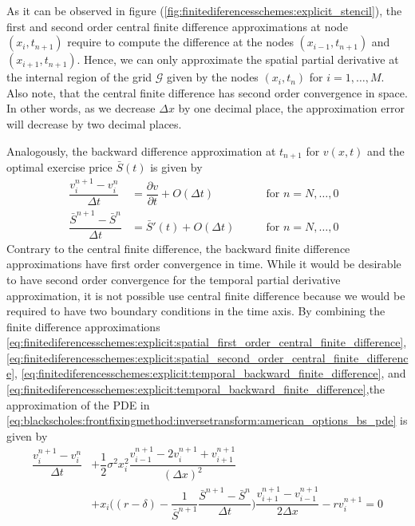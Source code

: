 As it can be observed in figure (\ref*{fig:finitediferencesschemes:explicit_stencil}), the first and second order central finite difference approximations at node $(x_i, t_{n+1})$ require to compute the difference at the nodes $(x_{i-1}, t_{n+1})$ and $(x_{i+1}, t_{n+1})$. Hence, we can only approximate the spatial partial derivative at the internal region of the grid $\mathcal{G}$ given by the nodes $(x_i, t_n)$ for $i=1,\dots,M$. Also note, that the central finite difference has second order convergence in space. In other words, as we decrease $\Delta{x}$ by one decimal place, the approximation error will decrease by two decimal places.

Analogously, the backward difference approximation at $t_{n+1}$ for $v(x, t)$ and the optimal exercise price $\bar{S}(t)$ is given by
\begin{align}
  \label{eq:finitediferencesschemes:explicit:temporal_backward_finite_difference}
  \dfrac{v^{n+1}_{i} - v^{n}_{i}}{\Delta{t}} &= \dfrac{\partial{v}}{\partial{t}}+ O(\Delta{t}) \qquad & \text{for $n = N,\dots,0$ } \\
  \label{eq:finitediferencesschemes:explicit:front_temporal_backward_finite_difference}
  \dfrac{\bar{S}^{n+1}-\bar{S}^{n}}{\Delta t} &= \bar{S}'(t) + O(\Delta{t}) \qquad & \text{for $n = N,\dots,0$ }
\end{align}
Contrary to the central finite difference, the backward finite difference approximations have first order convergence in time. While it would be desirable to have second order convergence for the temporal partial derivative approximation, it is not possible use central finite difference because we would be required to have two boundary conditions in the time axis. By combining the finite difference approximations \eqref{eq:finitediferencesschemes:explicit:spatial_first_order_central_finite_difference}, \eqref{eq:finitediferencesschemes:explicit:spatial_second_order_central_finite_difference}, \eqref{eq:finitediferencesschemes:explicit:temporal_backward_finite_difference}, and \eqref{eq:finitediferencesschemes:explicit:temporal_backward_finite_difference},the approximation of the PDE in \eqref{eq:blackscholes:frontfixingmethod:inversetransform:american_options_bs_pde} is given by 
\begin{equation*}
  \begin{split}
    \dfrac{v^{n+1}_{i} - v^{n}_{i}}{\Delta{t}} & + \dfrac{1}{2}\sigma^2 x_i^2 \dfrac{v^{n+1}_{i-1} - 2v^{n+1}_{i} + v^{n+1}_{i+1}}{(\Delta{x})^2} \\ 
     & + x_i\bigg( (r-\delta) - \dfrac{1}{\bar{S}^{n+1}}\dfrac{\bar{S}^{n+1} - \bar{S}^{n}}{\Delta{t}} \bigg)\dfrac{v^{n+1}_{i+1} - v^{n+1}_{i-1}}{2\Delta{x}} - rv^{n+1}_{i} = 0
  \end{split}
\end{equation*}
